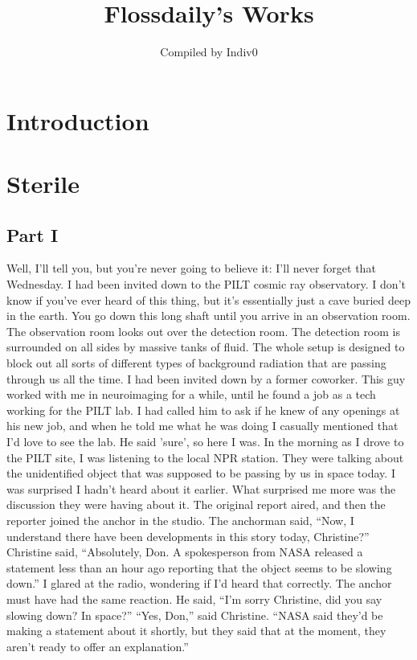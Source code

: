\documentclass[a4paper]{article}
\title{Flossdaily's Works}
\author{Compiled by Indiv0}
\begin{document}
\maketitle
\newpage
\tableofcontents
\newpage

\section{Introduction}

\section{Sterile}
    \subsection{Part I}
        Well, I'll tell you, but you're never going to believe it:
I'll never forget that Wednesday. I had been invited down to the PILT cosmic ray observatory. I don't know if you've ever heard of this thing, but it's essentially just a cave buried deep in the earth. You go down this long shaft until you arrive in an observation room.
The observation room looks out over the detection room. The detection room is surrounded on all sides by massive tanks of fluid. The whole setup is designed to block out all sorts of different types of background radiation that are passing through us all the time.
I had been invited down by a former coworker. This guy worked with me in neuroimaging for a while, until he found a job as a tech working for the PILT lab. I had called him to ask if he knew of any openings at his new job, and when he told me what he was doing I casually mentioned that I'd love to see the lab. He said 'sure', so here I was.
In the morning as I drove to the PILT site, I was listening to the local NPR station. They were talking about the unidentified object that was supposed to be passing by us in space today. I was surprised I hadn’t heard about it earlier. What surprised me more was the discussion they were having about it.
The original report aired, and then the reporter joined the anchor in the studio. The anchorman said, “Now, I understand there have been developments in this story today, Christine?”
Christine said, “Absolutely, Don. A spokesperson from NASA released a statement less than an hour ago reporting that the object seems to be slowing down.”
I glared at the radio, wondering if I’d heard that correctly. The anchor must have had the same reaction. He said, “I’m sorry Christine, did you say slowing down? In space?”
“Yes, Don,” said Christine. “NASA said they’d be making a statement about it shortly, but they said that at the moment, they aren’t ready to offer an explanation.”
\end{document}

